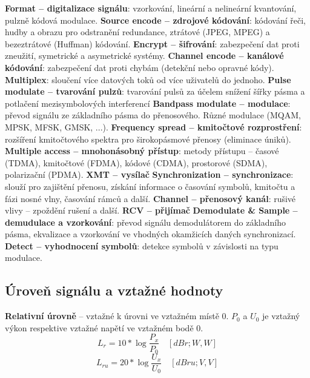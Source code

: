 \textbf{Format -- digitalizace signálu}: vzorkování, lineární a nelineární kvantování, pulzně kódová modulace.
\newline\textbf{Source encode -- zdrojové kódování}: kódování řeči, hudby a obrazu pro odstranění redundance, ztrátové (JPEG, MPEG) a bezeztrátové (Huffman) kódování.
\newline\textbf{Encrypt -- šifrování}: zabezpečení dat proti zneužití, symetrické a asymetrické systémy.
\newline\textbf{Channel encode -- kanálové kódování}: zabezpečení dat proti chybám (detekční nebo opravné kódy).
\newline\textbf{Multiplex}: sloučení více datových toků od více uživatelů do jednoho.
\newline\textbf{Pulse modulate -- tvarování pulzů}: tvarování pulsů za účelem snížení šířky pásma a potlačení mezisymbolových interferencí
\newline\textbf{Bandpass modulate -- modulace}: převod signálu ze základního pásma do přenosového. Různé modulace (MQAM, MPSK, MFSK, GMSK, ...).
\newline\textbf{Frequency spread -- kmitočtové rozprostření}: rozšíření kmitočtového spektra pro širokopásmové přenosy (eliminace úniků).
\newline\textbf{Multiple access -- mnohonásobný přístup}: metody přístupu -- časové (TDMA), kmitočtové (FDMA), kódové (CDMA), prostorové (SDMA), polarizační (PDMA).
\newline\textbf{XMT -- vysílač}
\newline\textbf{Synchronization -- synchronizace}: slouží pro zajištění přenosu, získání informace o časování symbolů, kmitočtu a fázi nosné vlny, časování rámců a další.
\newline\textbf{Channel -- přenosový kanál}: rušivé vlivy -- zpoždění rušení a další.
\newline\textbf{RCV -- přijímač}
\newline\textbf{Demodulate \& Sample -- demudulace a vzorkování}: převod signálu demodulátorem do základního pásma, ekvalizace a vzorkování ve vhodných okamžicích daných synchronizací.
\newline\textbf{Detect -- vyhodnocení symbolů}: detekce symbolů v závislosti na typu modulace.

\subsection{Úroveň signálu a vztažné hodnoty}
\textbf{Relativní úrovně} -- vztažné k úrovni ve vztažném místě 0. $P_0$ a $U_0$ je vztažný výkon respektive vztažné napětí ve vztažném bodě 0.
\[L_r=10*\log\frac{P_x}{P_0} \quad [dBr; W, W]\]
\[L_{ru}=20*\log\frac{U_x}{U_0} \quad [dBru; V, V]\]

